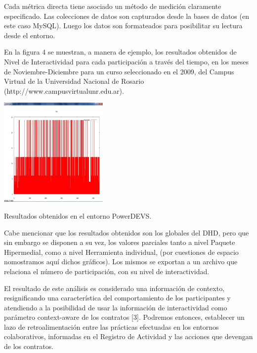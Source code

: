 Cada métrica directa tiene asociado un método de medición claramente
especificado. Las colecciones de datos son capturados desde la bases de datos
(en este caso MySQL). Luego los datos son formateados para posibilitar su
lectura desde el entorno.


En la figura 4 se muestran, a manera de ejemplo, los resultados obtenidos de
Nivel de Interactividad para cada participación a través del tiempo, en los
meses de Noviembre-Diciembre para un curso seleccionado en el 2009, del Campus
Virtual de la Universidad Nacional de Rosario
(http://www.campusvirtualunr.edu.ar).

\begin{center}
 \includegraphics[width=5 in,totalheight=4 in] {Ch9/f5.png}
\end{center}
\caption{Resultados obtenidos en el entorno PowerDEVS.}


Cabe mencionar que los resultados obtenidos son los globales del DHD, pero que
sin embargo se disponen a su vez, los valores parciales tanto a nivel Paquete
Hipermedial, como a nivel Herramienta individual, (por cuestiones de espacio
nomostramos aquí dichos gráficos). Los mismos se exportan a un archivo que 
relaciona el número de participación, con su nivel de interactividad.


El resultado de este análisis es considerado una información de contexto,
resignificando una característica del comportamiento de los participantes y
atendiendo a la posibilidad de usar la información de interactividad como
parámetro context-aware de los contratos [3]. Podremos entonces, establecer un
lazo de retroalimentación entre las prácticas efectuadas en los entornos
colaborativos, informadas en el Registro de Actividad y las acciones que
devengan de los contratos.

